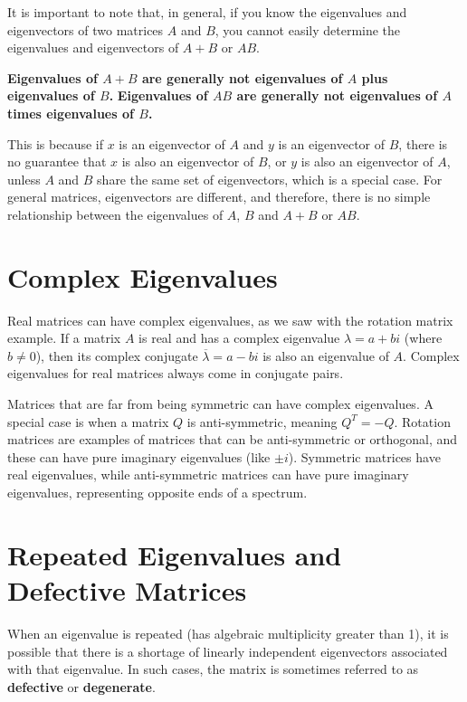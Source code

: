 \documentclass{article}
\begin{document}
It is important to note that, in general, if you know the eigenvalues and eigenvectors of two matrices $A$ and $B$, you cannot easily determine the eigenvalues and eigenvectors of $A + B$ or $AB$.

\textbf{Eigenvalues of $A+B$ are generally not eigenvalues of $A$ plus eigenvalues of $B$.}
\textbf{Eigenvalues of $AB$ are generally not eigenvalues of $A$ times eigenvalues of $B$.}

This is because if $x$ is an eigenvector of $A$ and $y$ is an eigenvector of $B$, there is no guarantee that $x$ is also an eigenvector of $B$, or $y$ is also an eigenvector of $A$, unless $A$ and $B$ share the same set of eigenvectors, which is a special case. For general matrices, eigenvectors are different, and therefore, there is no simple relationship between the eigenvalues of $A$, $B$ and $A+B$ or $AB$.

\section{Complex Eigenvalues}

Real matrices can have complex eigenvalues, as we saw with the rotation matrix example.  If a matrix $A$ is real and has a complex eigenvalue $\lambda = a + bi$ (where $b \neq 0$), then its complex conjugate $\overline{\lambda} = a - bi$ is also an eigenvalue of $A$. Complex eigenvalues for real matrices always come in conjugate pairs.

Matrices that are far from being symmetric can have complex eigenvalues.  A special case is when a matrix $Q$ is anti-symmetric, meaning $Q^T = -Q$. Rotation matrices are examples of matrices that can be anti-symmetric or orthogonal, and these can have pure imaginary eigenvalues (like $\pm i$). Symmetric matrices have real eigenvalues, while anti-symmetric matrices can have pure imaginary eigenvalues, representing opposite ends of a spectrum.

\section{Repeated Eigenvalues and Defective Matrices}

When an eigenvalue is repeated (has algebraic multiplicity greater than 1), it is possible that there is a shortage of linearly independent eigenvectors associated with that eigenvalue. In such cases, the matrix is sometimes referred to as \textbf{defective} or \textbf{degenerate}.
\end{document}
